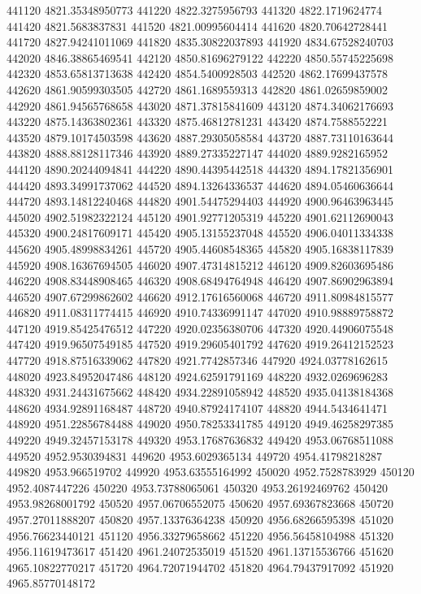 {441120 4821.35348950773
441220 4822.3275956793
441320 4822.1719624774
441420 4821.5683837831
441520 4821.00995604414
441620 4820.70642728441
441720 4827.94241011069
441820 4835.30822037893
441920 4834.67528240703
442020 4846.38865469541
442120 4850.81696279122
442220 4850.55745225698
442320 4853.65813713638
442420 4854.5400928503
442520 4862.17699437578
442620 4861.90599303505
442720 4861.1689559313
442820 4861.02659859002
442920 4861.94565768658
443020 4871.37815841609
443120 4874.34062176693
443220 4875.14363802361
443320 4875.46812781231
443420 4874.7588552221
443520 4879.10174503598
443620 4887.29305058584
443720 4887.73110163644
443820 4888.88128117346
443920 4889.27335227147
444020 4889.9282165952
444120 4890.20244094841
444220 4890.44395442518
444320 4894.17821356901
444420 4893.34991737062
444520 4894.13264336537
444620 4894.05460636644
444720 4893.14812240468
444820 4901.54475294403
444920 4900.96463963445
445020 4902.51982322124
445120 4901.92771205319
445220 4901.62112690043
445320 4900.24817609171
445420 4905.13155237048
445520 4906.04011334338
445620 4905.48998834261
445720 4905.44608548365
445820 4905.16838117839
445920 4908.16367694505
446020 4907.47314815212
446120 4909.82603695486
446220 4908.83448908465
446320 4908.68494764948
446420 4907.86902963894
446520 4907.67299862602
446620 4912.17616560068
446720 4911.80984815577
446820 4911.08311774415
446920 4910.74336991147
447020 4910.98889758872
447120 4919.85425476512
447220 4920.02356380706
447320 4920.44906075548
447420 4919.96507549185
447520 4919.29605401792
447620 4919.26412152523
447720 4918.87516339062
447820 4921.7742857346
447920 4924.03778162615
448020 4923.84952047486
448120 4924.62591791169
448220 4932.0269696283
448320 4931.24431675662
448420 4934.22891058942
448520 4935.04138184368
448620 4934.92891168487
448720 4940.87924174107
448820 4944.5434641471
448920 4951.22856784488
449020 4950.78253341785
449120 4949.46258297385
449220 4949.32457153178
449320 4953.17687636832
449420 4953.06768511088
449520 4952.9530394831
449620 4953.6029365134
449720 4954.41798218287
449820 4953.966519702
449920 4953.63555164992
450020 4952.7528783929
450120 4952.4087447226
450220 4953.73788065061
450320 4953.26192469762
450420 4953.98268001792
450520 4957.06706552075
450620 4957.69367823668
450720 4957.27011888207
450820 4957.13376364238
450920 4956.68266595398
451020 4956.76623440121
451120 4956.33279658662
451220 4956.56458104988
451320 4956.11619473617
451420 4961.24072535019
451520 4961.13715536766
451620 4965.10822770217
451720 4964.72071944702
451820 4964.79437917092
451920 4965.85770148172
}
